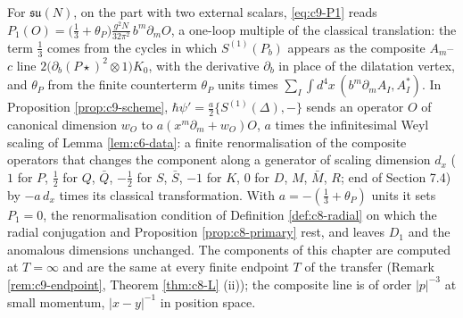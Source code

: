 \begin{remark}
For $\mathfrak{su}(N)$, on the part with two external scalars, \eqref{eq:c9-P1} reads $P_1(O)=\big(\tfrac13+\theta_P\big)\frac{g^2N}{32\pi^2}\,b^m\partial_mO$, a one-loop multiple of the classical translation: the term $\tfrac13$ comes from the cycles in which $S^{(1)}(P_b)$ appears as the composite $A_m$--$c$ line $2\big(\partial_b(P\star)^2\otimes1\big)K_0$, with the derivative $\partial_b$ in place of the dilatation vertex, and $\theta_P$ from the finite counterterm $\theta_P$ units times $\sum_I\int d^4x\,(b^m\partial_mA_I,A^*_I)$. In Proposition \ref{prop:c9-scheme}, $\hbar\psi'=\tfrac a2\{S^{(1)}(\Delta),-\}$ sends an operator $O$ of canonical dimension $w_O$ to $a(x^m\partial_m+w_O)O$, $a$ times the infinitesimal Weyl scaling of Lemma \ref{lem:c6-data}: a finite renormalisation of the composite operators that changes the component along a generator of scaling dimension $d_x$ ($1$ for $P$, $\tfrac12$ for $Q$, $\bar Q$, $-\tfrac12$ for $S$, $\bar S$, $-1$ for $K$, $0$ for $D$, $M$, $\bar M$, $R$; end of Section 7.4) by $-a\,d_x$ times its classical transformation. With $a=-(\tfrac13+\theta_P)$ units it sets $P_1=0$, the renormalisation condition of Definition \ref{def:c8-radial} on which the radial conjugation and Proposition \ref{prop:c8-primary} rest, and leaves $D_1$ and the anomalous dimensions unchanged. The components of this chapter are computed at $T=\infty$ and are the same at every finite endpoint $T$ of the transfer (Remark \ref{rem:c9-endpoint}, Theorem \ref{thm:c8-L} (ii)); the composite line is of order $|p|^{-3}$ at small momentum, $|x-y|^{-1}$ in position space.
\end{remark}
